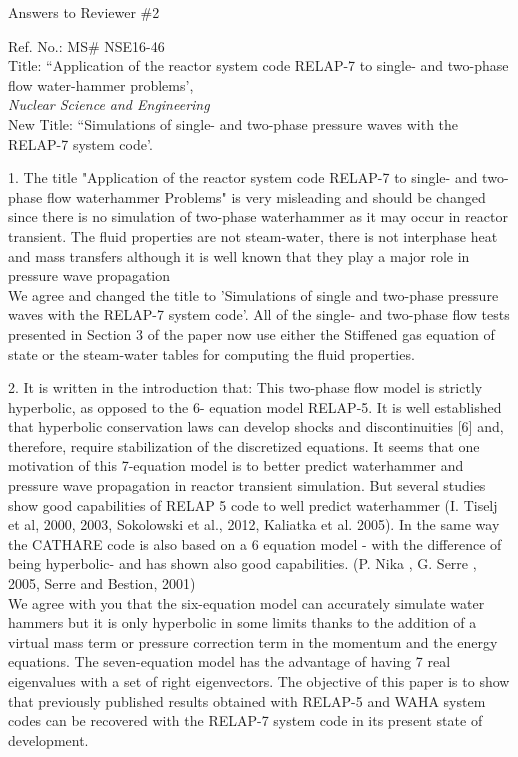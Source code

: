 \documentclass{article}
\begin{document}
\begin{center}
{ \Large Answers to Reviewer \#2}
\end{center}

\bigskip

\noindent Ref. No.: MS\# NSE16-46\\
Title: ``Application of the reactor system code RELAP-7 to single- and two-phase flow water-hammer problems', \\
{\it Nuclear Science and Engineering}\\
New Title: ``Simulations of single- and two-phase pressure waves with the RELAP-7 system code'.

\bigskip
\bigskip

{\color{blue}
1. The title "Application of the reactor system code RELAP-7 to single- and two-phase flow waterhammer Problems" is very misleading and should be changed since there is no simulation of two-phase waterhammer as it may occur in reactor transient. The fluid properties are not steam-water, there is not interphase heat and mass transfers although it is well known that they play a major role in pressure wave propagation
\\}
We agree and changed the title to 'Simulations of single and two-phase pressure waves with the RELAP-7 system code'. All of the single- and two-phase flow tests presented in Section 3 of the paper now use either the Stiffened gas equation of state or the steam-water tables for computing the fluid properties.
\bigskip

{\color{blue}
2. It is written in the introduction that:
This two-phase flow model is strictly hyperbolic, as opposed to the 6- equation model RELAP-5. It is well established that hyperbolic conservation laws can develop shocks and discontinuities [6] and, therefore, require stabilization of the discretized equations.
It seems that one motivation of this 7-equation model is to better predict waterhammer and pressure wave propagation in reactor transient simulation. But several studies show good capabilities of RELAP 5 code to well predict waterhammer (I. Tiselj et al, 2000, 2003, Sokolowski et al., 2012, Kaliatka et al. 2005). In the same way the CATHARE code is also based on a 6 equation model - with the difference of being hyperbolic- and has shown also good capabilities. (P. Nika , G. Serre , 2005, Serre and Bestion, 2001) \\
}
We agree with you that the six-equation model can accurately simulate water hammers but it is only hyperbolic in some limits thanks to the addition of a virtual mass term or pressure correction term in the momentum and the energy equations. The seven-equation model has the advantage of having 7 real eigenvalues with a set of right eigenvectors. The objective of this paper is to show that previously published results obtained with RELAP-5 and WAHA system codes can be recovered with the RELAP-7 system code in its present state of development.
\bigskip
\end{document}
